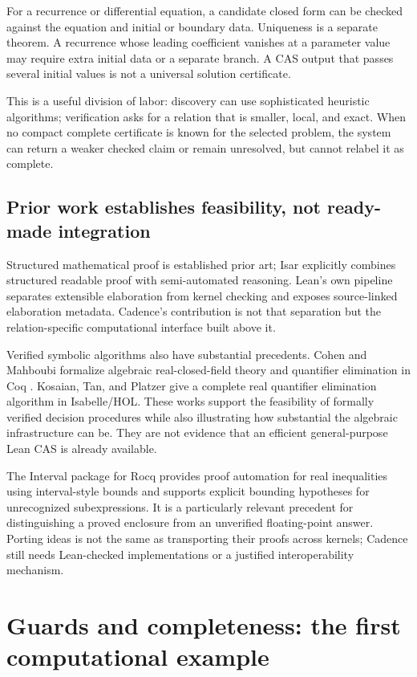 \documentclass[11pt,letterpaper]{article}
\theoremstyle{definition}
\begin{document}
For a recurrence or differential equation, a candidate closed form can be checked
against the equation and initial or boundary data. Uniqueness is a separate theorem.
A recurrence whose leading coefficient vanishes at a parameter value may require
extra initial data or a separate branch. A CAS output that passes several initial
values is not a universal solution certificate.

This is a useful division of labor: discovery can use sophisticated heuristic
algorithms; verification asks for a relation that is smaller, local, and exact.
When no compact complete certificate is known for the selected problem, the
system can return a weaker checked claim or remain unresolved, but cannot relabel
it as complete.

\subsection{Prior work establishes feasibility, not ready-made integration}
Structured mathematical proof is established prior art; Isar explicitly combines
structured readable proof with semi-automated reasoning\cite{isar}. Lean's own
pipeline separates extensible elaboration from kernel checking and exposes
source-linked elaboration metadata\cite{leanelab}. Cadence's contribution is not
that separation but the relation-specific computational interface built above it.

Verified symbolic algorithms also have substantial precedents. Cohen and Mahboubi
formalize algebraic real-closed-field theory and quantifier elimination in Coq
\cite{cohenmahboubi}. Kosaian, Tan, and Platzer give a complete real quantifier
elimination algorithm in Isabelle/HOL\cite{kosaian}. These works support the
feasibility of formally verified decision procedures while also illustrating how
substantial the algebraic infrastructure can be. They are not evidence that an
efficient general-purpose Lean CAS is already available.

The Interval package for Rocq provides proof automation for real inequalities
using interval-style bounds and supports explicit bounding hypotheses for
unrecognized subexpressions\cite{interval}. It is a particularly relevant
precedent for distinguishing a proved enclosure from an unverified floating-point
answer. Porting ideas is not the same as transporting their proofs across kernels;
Cadence still needs Lean-checked implementations or a justified interoperability
mechanism.

\section{Guards and completeness: the first computational example}\label{sec:linear}
\end{document}
